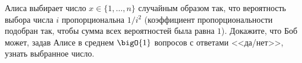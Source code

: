 Алиса выбирает число $x \in \{1, \dots, n\}$ случайным образом так, что вероятность выбора числа $i$
пропорциональна $1 / i^2$ (коэффициент пропорциональности подобран так, чтобы сумма всех вероятностей
была равна $1$). Докажите, что Боб может, задав Алисе в среднем $\bigO{1}$ вопросов с ответами <<да/нет>>,
узнать выбранное число.